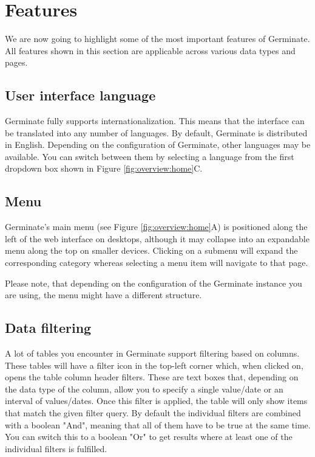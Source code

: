 \section{Features}
We are now going to highlight some of the most important features of Germinate. All features shown in this section are applicable across various data types and pages.

\subsection{User interface language}
\label{sec:features:language-selector}
Germinate fully supports internationalization. This means that the interface can be translated into any number of languages. By default, Germinate is distributed in English. Depending on the configuration of Germinate, other languages may be available. You can switch between them by selecting a language from the first dropdown box shown in Figure \ref{fig:overview:home}C.

\subsection{Menu}
\label{sec:features:menu}
Germinate's main menu (see Figure \ref{fig:overview:home}A) is positioned along the left of the web interface on desktops, although it may collapse into an expandable menu along the top on smaller devices. Clicking on a submenu will expand the corresponding category whereas selecting a menu item will navigate to that page.

Please note, that depending on the configuration of the Germinate instance you are using, the menu might have a different structure.

\subsection{Data filtering}
\label{sec:features:filtering}
A lot of tables you encounter in Germinate support filtering based on columns. These tables will have a filter icon in the top-left corner which, when clicked on, opens the table column header filters. These are text boxes that, depending on the data type of the column, allow you to specify a single value/date or an interval of values/dates. Once this filter is applied, the table will only show items that match the given filter query. By default the individual filters are combined with a boolean "And", meaning that all of them have to be true at the same time. You can switch this to a boolean "Or" to get results where at least one of the individual filters is fulfilled.


